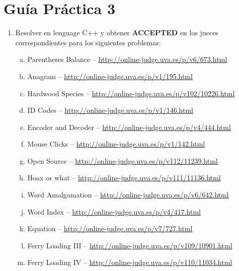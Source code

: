




\section*{Gu\'ia Pr\'actica 3}

\begin{enumerate}[1 -]
	
	\item Resolver en lenguage C++ y obtener \textbf{ACCEPTED} en los jueces correspondientes para los siguientes problemas:
	
	\begin{enumerate}[a)]	
		\item Parentheses Balance -- \href{http://online-judge.uva.es/p/v6/673.html}{http://online-judge.uva.es/p/v6/673.html}
		\item Anagram -- \href{http://online-judge.uva.es/p/v1/195.html}{http://online-judge.uva.es/p/v1/195.html}
		\item Hardwood Species -- \href{http://online-judge.uva.es/p/v102/10226.html}{http://online-judge.uva.es/p/v102/10226.html} 
		\item ID Codes -- \href{http://online-judge.uva.es/p/v1/146.html}{http://online-judge.uva.es/p/v1/146.html}
		\item Encoder and Decoder -- \href{http://online-judge.uva.es/p/v4/444.html}{http://online-judge.uva.es/p/v4/444.html}
		\item Mouse Clicks -- \href{http://online-judge.uva.es/p/v1/142.html}{http://online-judge.uva.es/p/v1/142.html}	
		\item Open Source -- \href{http://online-judge.uva.es/p/v112/11239.html}{http://online-judge.uva.es/p/v112/11239.html}	
		\item Hoax or what -- \href{http://online-judge.uva.es/p/v111/11136.html}{http://online-judge.uva.es/p/v111/11136.html}		
		\item Word Amalgamation -- \href{http://online-judge.uva.es/p/v6/642.html}{http://online-judge.uva.es/p/v6/642.html}
		\item Word Index -- \href{http://online-judge.uva.es/p/v4/417.html}{http://online-judge.uva.es/p/v4/417.html}
		\item Equation -- \href{http://online-judge.uva.es/p/v7/727.html}{http://online-judge.uva.es/p/v7/727.html}
		\item Ferry Loading III -- \href{http://online-judge.uva.es/p/v109/10901.html}{http://online-judge.uva.es/p/v109/10901.html}		
		\item Ferry Loading IV -- \href{http://online-judge.uva.es/p/v110/11034.html}{http://online-judge.uva.es/p/v110/11034.html}
	\end{enumerate}


\end{enumerate}


